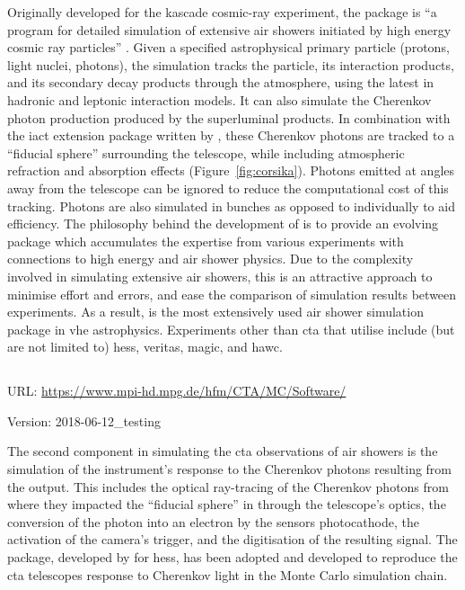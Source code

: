 \noindent Originally developed for the \gls{kascade} cosmic-ray experiment, the  package is ``a program for detailed simulation of extensive air showers initiated by high energy cosmic ray particles'' \cite[][p. i]{heck1998corsika}. Given a specified astrophysical primary particle (protons, light nuclei, photons), the simulation tracks the particle, its interaction products, and its secondary decay products through the atmosphere, using the latest in hadronic and leptonic interaction models. It can also simulate the Cherenkov photon production produced by the superluminal products. In combination with the \gls{iact} extension package written by \textcite{Bernlohr2008}, these Cherenkov photons are tracked to a ``fiducial sphere'' surrounding the telescope, while including atmospheric refraction and absorption effects (Figure~\ref{fig:corsika}). Photons emitted at angles away from the telescope can be ignored to reduce the computational cost of this tracking. Photons are also simulated in bunches as opposed to individually to aid efficiency. The philosophy behind the development of  is to provide an evolving package which accumulates the expertise from various experiments with connections to high energy and air shower physics. Due to the complexity involved in simulating extensive air showers, this is an attractive approach to minimise effort and errors, and ease the comparison of simulation results between experiments. As a result,  is the most extensively used air shower simulation package in \gls{vhe} astrophysics. Experiments other than \gls{cta} that utilise  include (but are not limited to) \gls{hess}, \gls{veritas}, \gls{magic}, and \gls{hawc}.

\subsection{}
\vspace{-0.7em}
\noindent \hspace{\parindent} {\tiny URL: \url{https://www.mpi-hd.mpg.de/hfm/CTA/MC/Software/} \par}
\noindent \hspace{\parindent} {\tiny Version: 2018-06-12\_testing \par}

\noindent The second component in simulating the \gls{cta} observations of air showers is the simulation of the instrument's response to the Cherenkov photons resulting from the  output. This includes the optical ray-tracing of the Cherenkov photons from where they impacted the ``fiducial sphere'' in  through the telescope's optics, the conversion of the photon into an electron by the sensors photocathode, the activation of the camera's trigger, and the digitisation of the resulting signal. The  package, developed by \textcite{Bernlohr2008} for \gls{hess}, has been adopted and developed to reproduce the \gls{cta} telescopes response to Cherenkov light in the Monte Carlo simulation chain.


